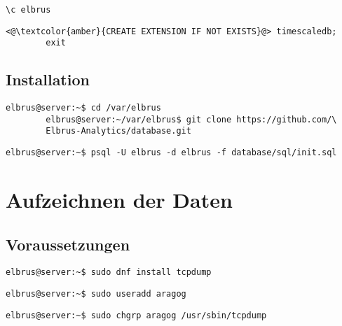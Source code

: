 \documentclass{article}
\begin{document}
	\begin{lstlisting}[caption={Wechseln zu erstellter Datenbank}, numbers=none]
		\c elbrus
	\end{lstlisting}

	\begin{lstlisting}[caption={Hinzufügen der TimescaleDB Erweiterung.}, numbers=none]
		<@\textcolor{amber}{CREATE EXTENSION IF NOT EXISTS}@> timescaledb;
		exit
	\end{lstlisting}

	\newpage
	\subsection{Installation}
	\lstset{style=commands}
	\begin{lstlisting}[caption={Clonen der Software von GitHub.}]
		elbrus@server:~$ cd /var/elbrus
		elbrus@server:~/var/elbrus$ git clone https://github.com/\
		Elbrus-Analytics/database.git
	\end{lstlisting}

	\begin{lstlisting}[caption={Anlegen der benötigten Tabellen duch das ausführen von 'init.sql'.}]
		elbrus@server:~$ psql -U elbrus -d elbrus -f database/sql/init.sql
	\end{lstlisting}
	
	\newpage
	
	\section{Aufzeichnen der Daten}
	\subsection[dependencies]{Voraussetzungen}
	\lstset{style=commands}
	\begin{lstlisting}[caption={Installieren von 'tcpdump' für das aufzeichnen von Daten.}]
		elbrus@server:~$ sudo dnf install tcpdump
	\end{lstlisting}

	\begin{lstlisting}[caption={Anlegen eines Users der Berechtigungen zum ausführen von 'tcpdump' erhält.}]
		elbrus@server:~$ sudo useradd aragog
	\end{lstlisting}
	
	\begin{lstlisting}[caption={Zuweisen von 'tcpdump' zu der Gruppe 'aragog'.}]
		elbrus@server:~$ sudo chgrp aragog /usr/sbin/tcpdump
	\end{lstlisting}
	
\end{document}
